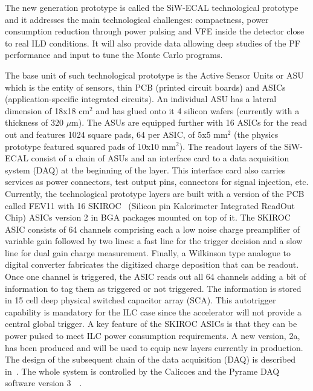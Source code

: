 \documentclass[a4paper,11pt]{article}
\begin{document}
The new generation prototype is called the SiW-ECAL technological prototype  and it addresses the main technological challenges: compactness,
power consumption reduction through power pulsing and VFE inside the detector close to real ILD conditions.
It will also provide data allowing deep studies of the PF performance and input to tune the Monte Carlo programs.

The base unit of such technological prototype is the Active Sensor Units or ASU which is the entity of sensors, thin PCB (printed circuit boards) and ASICs (application-specific integrated circuits).
An individual ASU has a lateral dimension of 18x18 cm$^{2}$ and has glued onto it 4 silicon wafers (currently with a thickness of 320 $\mu$m).
The ASUs are equipped
further with 16 ASICs for the read out and features 1024 square pads, 64 per ASIC, of 5x5 mm$^{2}$ (the physics prototype featured squared pads of 10x10 mm$^{2}$).
The readout layers of the SiW-ECAL consist of a chain of ASUs and an interface card
to a data acquisition system (DAQ) at the beginning of the layer.
This interface card also carries services as power connectors,
test output pins, connectors for signal injection, etc. 
Currently, the technological prototype layers are built with a version of the PCB called FEV11 with
16 SKIROC~\cite{Callier:2011zz} (Silicon pin Kalorimeter Integrated ReadOut Chip) ASICs version 2
in BGA packages mounted on top of it. The SKIROC ASIC consists of 64 channels comprising each a low noise charge preamplifier of variable gain followed by two lines:
a fast line for the trigger decision and a slow line for dual gain charge measurement.
Finally, a Wilkinson type analogue to digital converter fabricates the digitized charge deposition that can be readout.
Once one channel is triggered, the ASIC reads out all 64 channels adding a bit of information to tag them as triggered or not triggered.
The information is stored in 15 cell deep physical switched capacitor array (SCA).
This autotrigger capability is mandatory for the ILC case since the accelerator will not provide a central global trigger.
A key feature of the SKIROC ASICs is that they can be power pulsed to meet ILC power consumption requirements.
A new version, 2a, has been produced and will be used to equip new layers currently in production.
The design of the subsequent chain of the data acquisition (DAQ) is described in~\cite{Gastaldi:2014vaa}. 
The whole system is controlled by the Calicoes and the Pyrame DAQ software version 3~~\cite{pyrame1,pyrame2}.
\end{document}
